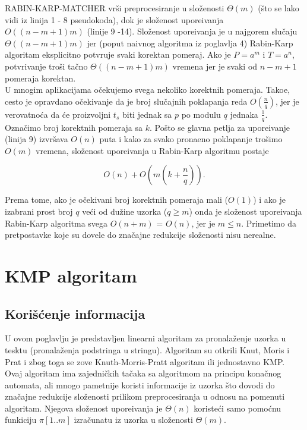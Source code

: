 \documentclass[a4paper,12pt]{article}
\begin{document}
RABIN-KARP-MATCHER vr\v si preprocesiranje u slo\v zenosti $\Theta(m)$ (\v sto se lako vidi iz linija 1 - 8 pseudokoda), dok je slo\v zenost upore\dj ivanja $O((n - m + 1)m)$ (linije 9 -14). Slo\v zenost upore\dj ivanja je u najgorem slu\v caju $\Theta((n - m + 1)m)$ jer (poput naivnog algoritma iz poglavlja 4) Rabin-Karp algoritam eksplicitno potvr\dj uje svaki korektan pomeraj. Ako je $P = a^m$ i $T = a^n$, potvr\dj ivanje tro\v si ta\v cno $\Theta((n - m + 1)m)$ vremena jer je svaki od $n - m + 1$ pomeraja korektan.
\\

U mnogim aplikacijama o\v cekujemo svega nekoliko korektnih pomeraja. Tako\dj e, cesto je opravdano o\v cekivanje da je broj slu\v cajnih poklapanja reda $O(\frac{n}{q})$, jer je verovatno\' ca da \' ce proizvoljni $t_s$ biti jednak sa $p$ po modulu $q$ jednaka $\frac{1}{q}$. Ozna\v cimo broj korektnih pomeraja sa $k$. Po\v sto se glavna petlja za upore\dj ivanje (linija 9) izvr\v sava $O(n)$ puta i kako za svako prona\dj eno poklapanje tro\v simo $O(m)$ vremena, slo\v zenost upore\dj ivanja u  Rabin-Karp algoritmu postaje

\begin{equation}
O(n) + O(m(k + \frac{n}{q})).
\end{equation}

Prema tome, ako je o\v cekivani broj korektnih pomeraja mali ($O(1)$) i ako je izabrani prost broj $q$ ve\' ci od du\v zine uzorka ($q \geq m$) onda je slo\v zenost upore\dj ivanja Rabin-Karp algoritma svega $O(n + m)$ = $O(n)$, jer je $m \leq n$. Primetimo da pretpostavke koje su dovele do zna\v cajne redukcije slo\v zenosti nisu nerealne.


\section{KMP algoritam}

\subsection{Kori\v s\' cenje informacija}

U ovom poglavlju je predstavljen linearni algoritam za pronala\v zenje uzorka u tesktu (pronala\v zenja podstringa u stringu). Algoritam su otkrili Knut, Moris i Prat i zbog toga se zove Knuth-Morris-Pratt algoritam ili jednostavno KMP. Ovaj algoritam ima zajedni\v ckih ta\v caka sa algoritmom na principu kona\v cnog automata, ali mnogo pametnije koristi informacije iz uzorka \v sto dovodi do zna\v cajne redukcije slo\v zenosti prilikom preprocesiranja u odnosu na pomenuti algoritam. Njegova slo\v zenost upore\dj ivanja je $\Theta(n)$ koriste\' ci samo pomo\' cnu funkiciju $\pi[1..m]$ izra\v cunatu iz uzorka u slo\v zenosti $\Theta(m)$.
\\
\end{document}
